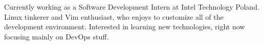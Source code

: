 

\begin{cvparagraph}

Currently working as a Software Development Intern at Intel Technology Poland. Linux tinkerer and Vim enthusiast, who enjoys to customize all of the development environment. Interested in learning new technologies, right now focusing mainly on DevOps stuff.
\end{cvparagraph}
